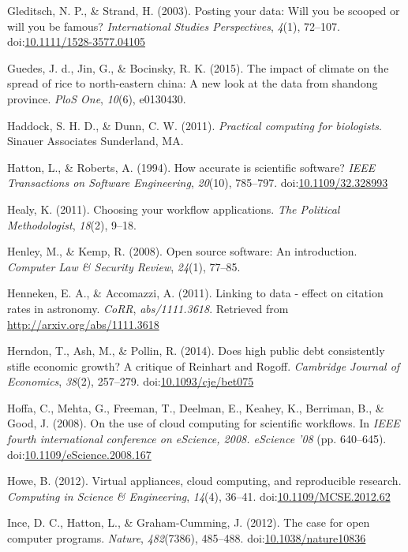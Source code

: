 \documentclass[american,man]{apa6}
\begin{document}
Gleditsch, N. P., \& Strand, H. (2003). Posting your data: Will you be
scooped or will you be famous? \emph{International Studies
Perspectives}, \emph{4}(1), 72--107.
doi:\href{http://dx.doi.org/10.1111/1528-3577.04105}{10.1111/1528-3577.04105}

Guedes, J. d., Jin, G., \& Bocinsky, R. K. (2015). The impact of climate
on the spread of rice to north-eastern china: A new look at the data
from shandong province. \emph{PloS One}, \emph{10}(6), e0130430.

Haddock, S. H. D., \& Dunn, C. W. (2011). \emph{Practical computing for
biologists}. Sinauer Associates Sunderland, MA.

Hatton, L., \& Roberts, A. (1994). How accurate is scientific software?
\emph{IEEE Transactions on Software Engineering}, \emph{20}(10),
785--797.
doi:\href{http://dx.doi.org/10.1109/32.328993}{10.1109/32.328993}

Healy, K. (2011). Choosing your workflow applications. \emph{The
Political Methodologist}, \emph{18}(2), 9--18.

Henley, M., \& Kemp, R. (2008). Open source software: An introduction.
\emph{Computer Law \& Security Review}, \emph{24}(1), 77--85.

Henneken, E. A., \& Accomazzi, A. (2011). Linking to data - effect on
citation rates in astronomy. \emph{CoRR}, \emph{abs/1111.3618}.
Retrieved from \url{http://arxiv.org/abs/1111.3618}

Herndon, T., Ash, M., \& Pollin, R. (2014). Does high public debt
consistently stifle economic growth? A critique of Reinhart and Rogoff.
\emph{Cambridge Journal of Economics}, \emph{38}(2), 257--279.
doi:\href{http://dx.doi.org/10.1093/cje/bet075}{10.1093/cje/bet075}

Hoffa, C., Mehta, G., Freeman, T., Deelman, E., Keahey, K., Berriman,
B., \& Good, J. (2008). On the use of cloud computing for scientific
workflows. In \emph{IEEE fourth international conference on eScience,
2008. eScience '08} (pp. 640--645).
doi:\href{http://dx.doi.org/10.1109/eScience.2008.167}{10.1109/eScience.2008.167}

Howe, B. (2012). Virtual appliances, cloud computing, and reproducible
research. \emph{Computing in Science \& Engineering}, \emph{14}(4),
36--41.
doi:\href{http://dx.doi.org/10.1109/MCSE.2012.62}{10.1109/MCSE.2012.62}

Ince, D. C., Hatton, L., \& Graham-Cumming, J. (2012). The case for open
computer programs. \emph{Nature}, \emph{482}(7386), 485--488.
doi:\href{http://dx.doi.org/10.1038/nature10836}{10.1038/nature10836}
\end{document}
